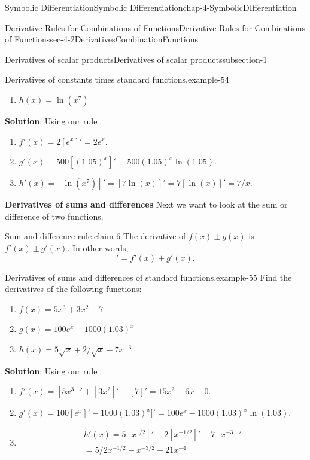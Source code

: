 \documentclass[oneside,10pt,]{book}
\newcommand{\terminology}[1]{\textbf{#1}}
\numberwithin{equation}{section}
\begin{document}
\begin{chapterptx}{Symbolic Differentiation}{}{Symbolic Differentiation}{}{}{chap-4-SymbolicDIfferentiation}
\begin{sectionptx}{Derivative Rules for Combinations of Functions}{}{Derivative Rules for Combinations of Functions}{}{}{sec-4-2DerivativesCombinationFunctions}
\begin{subsectionptx}{Derivatives of scalar products}{}{Derivatives of scalar products}{}{}{subsection-1}
\begin{example}{Derivatives of constants times standard functions.}{example-54}
\begin{enumerate}[label=(\alph*)]
\item\hypertarget{li-479}{}\(h(x)=\ln(x^7)\)%
\end{enumerate}
\hypertarget{p-1528}{}%
\terminology{Solution}: Using our rule%
\leavevmode%
\begin{enumerate}[label=(\alph*)]
\item\hypertarget{li-480}{}\(f'(x)=2[e^x ]'=2e^x.\)%
\item\hypertarget{li-481}{}\(g'(x)=500[(1.05)^x ]'=500(1.05)^x \ln(1.05).\)%
\item\hypertarget{li-482}{}\(h'(x)=[\ln(x^7)]'=[7 \ln(x)]'=7[\ln(x)]'=7/x.\)%
\end{enumerate}
\end{example}
\terminology{Derivatives of sums and differences}\hypertarget{p-1529}{}%
Next we want to look at the sum or difference of two functions.%
\begin{claim}{Sum and difference rule.}{}{claim-6}%
\hypertarget{p-1530}{}%
The derivative of \(f(x)\pm g(x)\) is \(f'(x)\pm g'(x)\).   In other words,%
\begin{equation*}
[f(x)\pm g(x)]'=f'(x)\pm g'(x)\text{.}
\end{equation*}
%
\end{claim}
\begin{example}{Derivatives of sums and differences of standard functions.}{example-55}%
\hypertarget{p-1531}{}%
Find the derivatives of the following functions:%
\leavevmode%
\begin{enumerate}[label=(\alph*)]
\item\hypertarget{li-483}{}\(f(x)=5x^3+3x^2-7\)%
\item\hypertarget{li-484}{}\(g(x)=100e^x-1000(1.03)^x\)%
\item\hypertarget{li-485}{}\(h(x)=5\sqrt{x}+2/\sqrt{x}-7x^{-3}\)%
\end{enumerate}
\hypertarget{p-1532}{}%
\terminology{Solution}: Using our rule%
\leavevmode%
\begin{enumerate}[label=(\alph*)]
\item\hypertarget{li-486}{}\(f'(x)=[5x^3 ]'+[3x^2 ]'-[7]'=15x^2+6x-0.\)%
\item\hypertarget{li-487}{}\(g'(x)=100[e^x]'-1000(1.03)^x]'=100e^x-1000(1.03)^x  \ln(1.03).\)%
\item\hypertarget{li-488}{}\hypertarget{p-1533}{}%
%
\begin{gather*}
h'(x)=5[x^{1/2}]'+2[x^{-1/2}]'-7[x^{-3}]'\\
=5/2 x^{-1/2}-x^{-3/2}+21 x^{-4}\\

\end{gather*}
\end{enumerate}
\end{example}
\end{subsectionptx}
\end{sectionptx}
\end{chapterptx}
\end{document}
